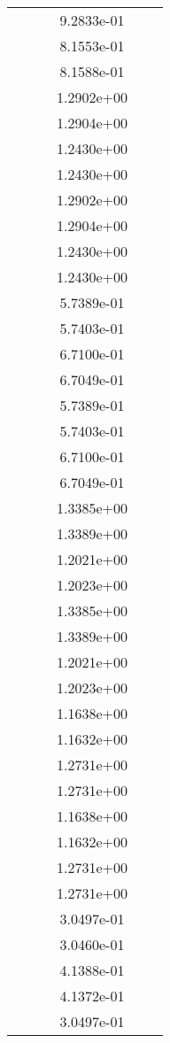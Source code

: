 \begin{xltabular}{\textwidth}{r|rS[table-format=1.3e+2]S[table-format=1.4e+2]S[table-format=1.4e+2]S[table-format=-1.5]}
&  &  & 9.2833e-01 & & \\
&  &  & 8.1553e-01 & & \\
&  &  & 8.1588e-01 & & \\
&  &  & 1.2902e+00 & & \\
&  &  & 1.2904e+00 & & \\
&  &  & 1.2430e+00 & & \\
&  &  & 1.2430e+00 & & \\
&  &  & 1.2902e+00 & & \\
&  &  & 1.2904e+00 & & \\
&  &  & 1.2430e+00 & & \\
&  &  & 1.2430e+00 & & \\
&  &  & 5.7389e-01 & & \\
&  &  & 5.7403e-01 & & \\
&  &  & 6.7100e-01 & & \\
&  &  & 6.7049e-01 & & \\
&  &  & 5.7389e-01 & & \\
&  &  & 5.7403e-01 & & \\
&  &  & 6.7100e-01 & & \\
&  &  & 6.7049e-01 & & \\
&  &  & 1.3385e+00 & & \\
&  &  & 1.3389e+00 & & \\
&  &  & 1.2021e+00 & & \\
&  &  & 1.2023e+00 & & \\
&  &  & 1.3385e+00 & & \\
&  &  & 1.3389e+00 & & \\
&  &  & 1.2021e+00 & & \\
&  &  & 1.2023e+00 & & \\
&  &  & 1.1638e+00 & & \\
&  &  & 1.1632e+00 & & \\
&  &  & 1.2731e+00 & & \\
&  &  & 1.2731e+00 & & \\
&  &  & 1.1638e+00 & & \\
&  &  & 1.1632e+00 & & \\
&  &  & 1.2731e+00 & & \\
&  &  & 1.2731e+00 & & \\
&  &  & 3.0497e-01 & & \\
&  &  & 3.0460e-01 & & \\
&  &  & 4.1388e-01 & & \\
&  &  & 4.1372e-01 & & \\
&  &  & 3.0497e-01 & & \\

\end{xltabular}

